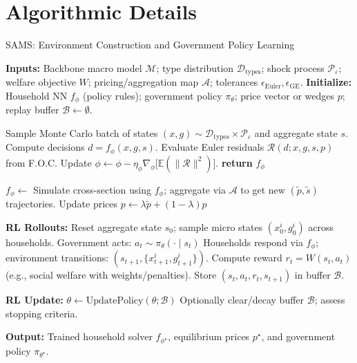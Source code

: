 \documentclass[11pt]{article}
\begin{document}
\appendix

\section{Algorithmic Details}
\begin{algorithm}[H]
\caption{SAMS: Environment Construction and Government Policy Learning}
\label{alg:sams}
\begin{algorithmic}[1]
\State \textbf{Inputs:} Backbone macro model $\mathcal{M}$; type distribution $\mathcal{D}_{\text{types}}$; shock process $\mathcal{P}_{\varepsilon}$; welfare objective $W$; pricing/aggregation map $\mathcal{A}$; tolerances $\epsilon_{\text{Euler}}, \epsilon_{\text{GE}}$.
\State \textbf{Initialize:} Household NN $f_{\phi}$ (policy rules); government policy $\pi_{\theta}$; price vector or wedges $p$; replay buffer $\mathcal{B}\leftarrow\emptyset$.

\Statex
{}
  \Repeat
    \State Sample Monte Carlo batch of states $(x,g)\sim \mathcal{D}_{\text{types}}\times \mathcal{P}_{\varepsilon}$ and aggregate state $s$.
    \State Compute decisions $d=f_{\phi}(x,g,s)$.
    \State Evaluate Euler residuals $\mathcal{R}(d; x,g,s,p)$ from F.O.C.
    \State Update $\phi \leftarrow \phi - \eta_{\phi}\nabla_{\phi}\big[\mathbb{E}(\|\mathcal{R}\|^2)\big]$.
  \State \textbf{return} $f_{\phi}$
\EndFunction

\Statex
\Repeat {}
  \State $f_{\phi}\leftarrow$ 
  \State Simulate cross-section using $f_{\phi}$; aggregate via $\mathcal{A}$ to get new $(\tilde{p}, \tilde{s})$ trajectories.
    \State Update prices $p \leftarrow \lambda \tilde{p} + (1-\lambda)p$ 
  \EndIf

  \State \textbf{RL Rollouts:}
    \State Reset aggregate state $s_0$; sample micro states $(x^i_0,g^i_0)$ across households.
      \State Government acts: $a_t \sim \pi_{\theta}(\cdot \mid s_t)$ 
      \State Households respond via $f_{\phi}$; environment transitions: $(s_{t+1}, \{x^i_{t+1},g^i_{t+1}\})$.
      \State Compute reward $r_t = W(s_t,a_t)$ (e.g., social welfare with weights/penalties).
      \State Store $(s_t,a_t,r_t,s_{t+1})$ in buffer $\mathcal{B}$.
    \EndFor
  \EndFor

  \State \textbf{RL Update:} $\theta \leftarrow \text{UpdatePolicy}(\theta;\mathcal{B})$ 
  \State Optionally clear/decay buffer $\mathcal{B}$; assess stopping criteria.

\State \textbf{Output:} Trained household solver $f_{\phi^\star}$, equilibrium prices $p^\star$, and government policy $\pi_{\theta^\star}$.
\end{algorithmic}
\end{algorithm}
\end{document}
